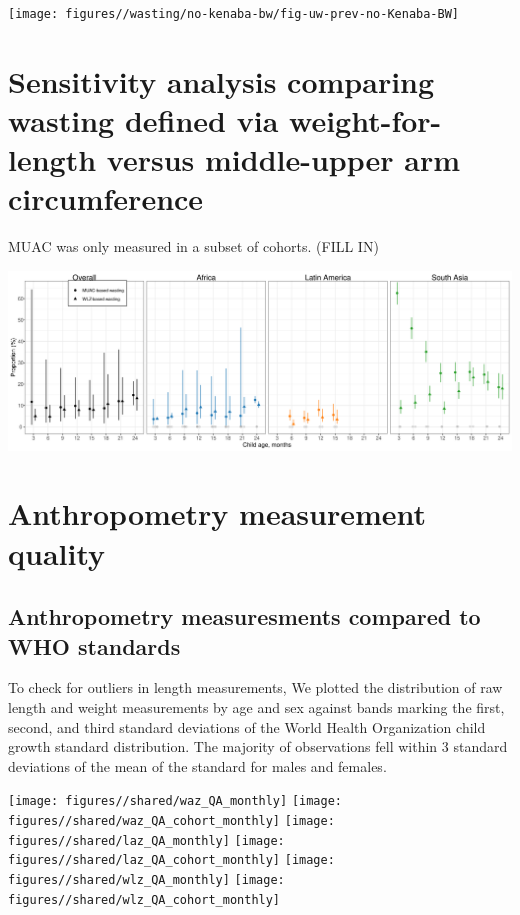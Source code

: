 \documentclass[
  9pt,
]{book}
\begin{document}
\texttt{[image: figures//wasting/no-kenaba-bw/fig-uw-prev-no-Kenaba-BW]}

\hypertarget{muac}{%
\chapter{Sensitivity analysis comparing wasting defined via weight-for-length versus middle-upper arm circumference}\label{muac}}

\raggedright

MUAC was only measured in a subset of cohorts. (FILL IN)

\includegraphics[width=58.33in]{figures//wasting/fig-wast-2-muac-overall_region--allage-primary}

\hypertarget{anthro}{%
\chapter{Anthropometry measurement quality}\label{anthro}}

\raggedright

\hypertarget{anthropometry-measuresments-compared-to-who-standards}{%
\section{Anthropometry measuresments compared to WHO standards}\label{anthropometry-measuresments-compared-to-who-standards}}

To check for outliers in length measurements, We plotted the distribution of raw length and weight measurements by age and sex against bands marking the first, second, and third standard deviations of the World Health Organization child growth standard distribution. The majority of observations fell within 3 standard deviations of the mean of the standard for males and females.

\texttt{[image: figures//shared/waz\_QA\_monthly]}
\texttt{[image: figures//shared/waz\_QA\_cohort\_monthly]}
\texttt{[image: figures//shared/laz\_QA\_monthly]}
\texttt{[image: figures//shared/laz\_QA\_cohort\_monthly]}
\texttt{[image: figures//shared/wlz\_QA\_monthly]}
\texttt{[image: figures//shared/wlz\_QA\_cohort\_monthly]}
\end{document}
